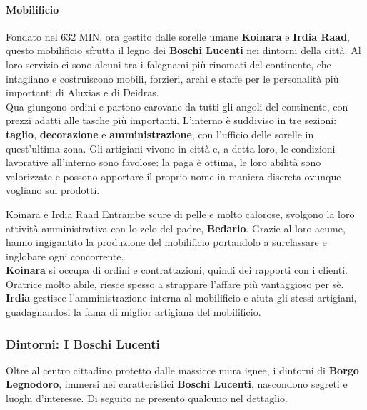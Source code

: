 \documentclass[10pt,twoside,onecolumn,openany]{book}
\begin{document}
\begin{multicols}{2}
\paragraph{Mobilificio}
Fondato nel 632 MIN, ora gestito dalle sorelle umane \textbf{Koinara} e \textbf{Irdia Raad}, questo mobilificio sfrutta il legno dei \textbf{Boschi Lucenti} nei dintorni della città. Al loro servizio ci sono alcuni tra i falegnami più rinomati del continente, che intagliano e costruiscono mobili, forzieri, archi e staffe per le personalità più importanti di Aluxias e di Deidras.\\
Qua giungono ordini e partono carovane da tutti gli angoli del continente, con prezzi adatti alle tasche più importanti. L'interno è suddiviso in tre sezioni: \textbf{taglio}, \textbf{decorazione} e \textbf{amministrazione}, con l'ufficio delle sorelle in quest'ultima zona. Gli artigiani vivono in città e, a detta loro, le condizioni lavorative all'interno sono favolose: la paga è ottima, le loro abilità sono valorizzate e possono apportare il proprio nome in maniera discreta ovunque vogliano sui prodotti.
\begin{paperbox}{{Koinara e Irdia Raad}}
	Entrambe scure di pelle e molto calorose, svolgono la loro attività amministrativa con lo zelo del padre, \textbf{Bedario}. Grazie al loro acume, hanno ingigantito la produzione del mobilificio portandolo a surclassare e inglobare ogni concorrente.\\
	\textbf{Koinara} si occupa di ordini e contrattazioni, quindi dei rapporti con i clienti. Oratrice molto abile, riesce spesso a strappare l'affare più vantaggioso per sè.\\
	\textbf{Irdia} gestisce l'amministrazione interna al mobilificio e aiuta gli stessi artigiani, guadagnandosi la fama di miglior artigiana del mobilificio.
\end{paperbox}
\end{multicols}
\subsubsection{Dintorni: I Boschi Lucenti}
Oltre al centro cittadino protetto dalle massicce mura ignee, i dintorni di \textbf{Borgo Legnodoro}, immersi nei caratteristici \textbf{Boschi Lucenti}, nascondono segreti e luoghi d'interesse. Di seguito ne presento qualcuno nel dettaglio.
\end{document}
